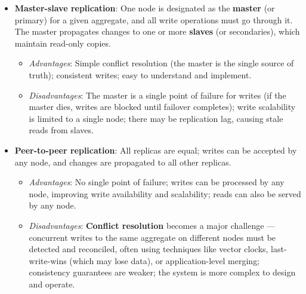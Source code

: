 \begin{itemize}
    \item \textbf{Master-slave replication}: One node is designated as the \textbf{master} (or primary) for a given aggregate, and all write operations must go through it. The master propagates changes to one or more \textbf{slaves} (or secondaries), which maintain read-only copies. 
    \begin{itemize}
        \item \emph{Advantages}: Simple conflict resolution (the master is the single source of truth); consistent writes; easy to understand and implement.
        \item \emph{Disadvantages}: The master is a single point of failure for writes (if the master dies, writes are blocked until failover completes); write scalability is limited to a single node; there may be replication lag, causing stale reads from slaves.
    \end{itemize}
    
    \item \textbf{Peer-to-peer replication}: All replicas are equal; writes can be accepted by any node, and changes are propagated to all other replicas.
    \begin{itemize}
        \item \emph{Advantages}: No single point of failure; writes can be processed by any node, improving write availability and scalability; reads can also be served by any node.
        \item \emph{Disadvantages}: \textbf{Conflict resolution} becomes a major challenge --- concurrent writes to the same aggregate on different nodes must be detected and reconciled, often using techniques like vector clocks, last-write-wins (which may lose data), or application-level merging; consistency guarantees are weaker; the system is more complex to design and operate.
    \end{itemize}
\end{itemize}

